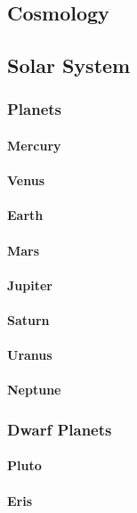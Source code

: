 		
		\subsection{Cosmology}
		\subsection{Solar System}
			\subsubsection{Planets}
				\paragraph{Mercury}
				\paragraph{Venus}
				\paragraph{Earth}
				\paragraph{Mars}
				\paragraph{Jupiter} \label{Jupiter}
				\paragraph{Saturn}
				\paragraph{Uranus}
				\paragraph{Neptune}
				
			\subsubsection{Dwarf Planets}
				\paragraph{Pluto}
				\paragraph{Eris}
